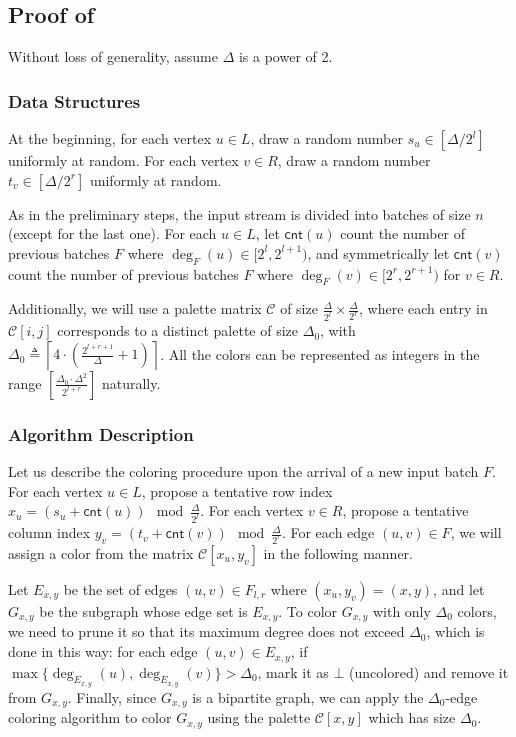 \documentclass[11pt,a4paper]{article}
\newcommand{\cnt}{\mathsf{cnt}}
\newcommand{\mat}{\mathcal{C}}
\begin{document}
\subsection{Proof of } \label{subsec:high}
Without loss of generality, assume $\Delta$ is a power of 2. 
\subsubsection{Data Structures}  
At the beginning, for each vertex $u \in L$, draw a random number $s_u \in [\Delta / 2^l]$ uniformly at random. For each vertex $v \in R$, draw a random number $t_v \in [\Delta / 2^r]$ uniformly at random. 

As in the preliminary steps, the input stream is divided into batches of size $n$ (except for the last one). For each $u\in L$, let $\cnt(u)$ count the number of previous batches $F$ where $\deg_{F}(u)\in [2^l, 2^{l+1})$, and symmetrically let $\cnt(v)$ count the number of previous batches $F$ where $\deg_F(v)\in [2^r, 2^{r+1})$ for $v\in R$.

Additionally, we will use a palette matrix $\mat$ of size $\frac{\Delta}{2^l} \times \frac{\Delta}{2^r}$, where each entry in $\mat[i,j]$ corresponds to a distinct palette of size $\Delta_0$, with $\Delta_0 \triangleq \left\lceil 4\cdot \left( \frac{2^{l+r+1}}{\Delta} + 1 \right) \right\rceil$. All the colors can be represented as integers in the range $\left[\frac{\Delta_0\cdot\Delta^2}{2^{l+r}}\right]$ naturally.


\subsubsection{Algorithm Description}
Let us describe the coloring procedure upon the arrival of a new input batch $F$. For each vertex $u \in L$, propose a tentative row index $x_u = (s_u + \cnt(u)) \mod \frac{\Delta}{2^l}$. For each vertex $v \in R$, propose a tentative column index $y_v = (t_v + \cnt(v)) \mod \frac{\Delta}{2^r}$. For each edge $(u, v) \in F$, we will assign a color from the matrix $\mat[x_u, y_v]$ in the following manner.

Let $E_{x, y}$ be the set of edges $(u, v) \in F_{l, r}$ where $(x_u, y_v) = (x, y)$, and let $G_{x, y}$ be the subgraph whose edge set is $E_{x, y}$. To color $G_{x, y}$ with only $\Delta_0$ colors, we need to prune it so that its maximum degree does not exceed $\Delta_0$, which is done in this way: for each edge $(u, v) \in E_{x, y}$, if $\max\{\deg_{E_{x, y}}(u), \deg_{E_{x, y}}(v)\} > \Delta_0$, mark it as $\bot$ (uncolored) and remove it from $G_{x, y}$. Finally, since $G_{x, y}$ is a bipartite graph, we can apply the $\Delta_0$-edge coloring algorithm \cite{cole2001edge} to color $G_{x, y}$ using the palette $\mat[x, y]$ which has size $\Delta_0$.
\end{document}
